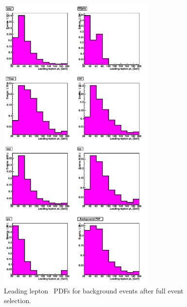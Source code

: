\begin{figure}[tp]
  \centerline{
    \includegraphics[width=0.7\textwidth]{figures/pdf_mc_all.pdf}
  }

  \caption[Background PDFs] {Leading lepton \pt\ PDFs for background
  events after full event selection.} \label{fig:bkgpdfs}
\end{figure}
